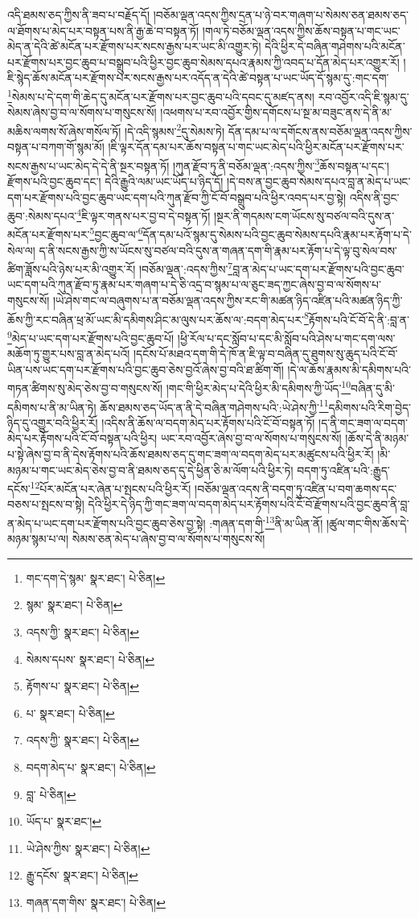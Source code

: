 འདི་ཐམས་ཅད་ཀྱིས་ནི་ཟབ་པ་བརྗོད་དོ། །བཅོམ་ལྡན་འདས་ཀྱིས་དྲན་པ་ཉེ་བར་གཞག་པ་སེམས་ཅན་ཐམས་ཅད་ལ་ཐོགས་པ་མེད་པར་བསྟན་པས་ནི་རྒྱ་ཆེ་བ་བསྟན་ཏོ། །གལ་ཏེ་བཅོམ་ལྡན་འདས་ཀྱིས་ཆོས་བསྟན་པ་གང་ཡང་མེད་ན་དེའི་ཚེ་མངོན་པར་རྫོགས་པར་སངས་རྒྱས་པར་ཡང་མི་འགྱུར་ཏེ། དེའི་ཕྱིར་དེ་བཞིན་གཤེགས་པའི་མངོན་པར་རྫོགས་པར་བྱང་ཆུབ་པ་བསྒྲུབ་པའི་ཕྱིར་བྱང་ཆུབ་སེམས་དཔའ་རྣམས་ཀྱི་འབད་པ་དོན་མེད་པར་འགྱུར་རོ། །ཇི་སྙེད་ཆོས་མངོན་པར་རྫོགས་པར་སངས་རྒྱས་པར་འདོད་ན་དེའི་ཚེ་བསྟན་པ་ཡང་ཡོད་དོ་སྙམ་དུ་:གང་དག་\footnote{གང་དག་དེ་སྙམ་  སྣར་ཐང་།  པེ་ཅིན། }སེམས་པ་དེ་དག་གི་ཆེད་དུ་མངོན་པར་རྫོགས་པར་བྱང་ཆུབ་པའི་དབང་དུ་མཛད་ནས། རབ་འབྱོར་འདི་ཇི་སྙམ་དུ་སེམས་ཞེས་བྱ་བ་ལ་སོགས་པ་གསུངས་སོ། །འཕགས་པ་རབ་འབྱོར་གྱིས་དགོངས་པ་སྔ་མ་བཟུང་ནས་དེ་ནི་མ་མཆིས་ལགས་སོ་ཞེས་གསོལ་ཏོ། །དེ་འདི་སྙམས་\footnote{སྙམ་  སྣར་ཐང་།  པེ་ཅིན། }དུ་སེམས་ཏེ། དོན་དམ་པ་ལ་དགོངས་ནས་བཅོམ་ལྡན་འདས་ཀྱིས་བསྟན་པ་བཀག་གོ་སྙམ་མོ། །ཇི་ལྟར་དོན་དམ་པར་ཆོས་བསྟན་པ་གང་ཡང་མེད་པའི་ཕྱིར་མངོན་པར་རྫོགས་པར་སངས་རྒྱས་པ་ཡང་མེད་དེ་དེ་ནི་སྔར་བསྟན་ཏོ། །ཀུན་རྫོབ་ཏུ་ནི་བཅོམ་ལྡན་:འདས་ཀྱིས་\footnote{འདས་ཀྱི་  སྣར་ཐང་།  པེ་ཅིན། }ཆོས་བསྟན་པ་དང་། རྫོགས་པའི་བྱང་ཆུབ་དང་། དེའི་རྒྱུའི་ལམ་ཡང་ཡོད་པ་ཉིད་དོ། །དེ་བས་ན་བྱང་ཆུབ་སེམས་དཔའ་བླ་ན་མེད་པ་ཡང་དག་པར་རྫོགས་པའི་བྱང་ཆུབ་ཡང་དག་པའི་ཀུན་རྫོབ་ཀྱི་ངོ་བོ་བསྒྲུབ་པའི་ཕྱིར་འབད་པར་བྱ་སྟེ། འདིས་ནི་བྱང་ཆུབ་:སེམས་དཔའ་\footnote{སེམས་དཔས་  སྣར་ཐང་།  པེ་ཅིན། }ཇི་ལྟར་གནས་པར་བྱ་བ་དེ་བསྟན་ཏོ། །སྔར་ནི་གདམས་ངག་ཡོངས་སུ་བཙལ་བའི་དུས་ན་མངོན་པར་རྫོགས་པར་\footnote{རྟོགས་པ་  སྣར་ཐང་།  པེ་ཅིན། }བྱང་ཆུབ་ལ་\footnote{པ་  སྣར་ཐང་།  པེ་ཅིན། }དོན་དམ་པའོ་སྙམ་དུ་སེམས་པའི་བྱང་ཆུབ་སེམས་དཔའི་རྣམ་པར་རྟོག་པ་དེ་སེལ་ལ། ད་ནི་སངས་རྒྱས་ཀྱི་ས་ཡོངས་སུ་བཙལ་བའི་དུས་ན་གཞན་དག་གི་རྣམ་པར་རྟོག་པ་དེ་ལྟ་བུ་སེལ་བས་ཚིག་ཟློས་པའི་ཉེས་པར་མི་འགྱུར་རོ། །བཅོམ་ལྡན་:འདས་ཀྱིས་\footnote{འདས་ཀྱི་  སྣར་ཐང་།  པེ་ཅིན། }བླ་ན་མེད་པ་ཡང་དག་པར་རྫོགས་པའི་བྱང་ཆུབ་ཡང་དག་པའི་ཀུན་རྫོབ་ཏུ་རྣམ་པར་གཞག་པ་དེ་ཅི་འདྲ་བ་སྙམ་པ་ལ་ཅུང་ཟད་ཀྱང་ཞེས་བྱ་བ་ལ་སོགས་པ་གསུངས་སོ། །ཡེ་ཤེས་གང་ལ་བཞུགས་པ་ན་བཅོམ་ལྡན་འདས་ཀྱིས་རང་གི་མཚན་ཉིད་འཛིན་པའི་མཚན་ཉིད་ཀྱི་ཆོས་ཀྱི་རང་བཞིན་ཕྲ་མོ་ཡང་མི་དམིགས་ཤིང་མ་ལུས་པར་ཆོས་ལ་:བདག་མེད་པར་\footnote{བདག་མེད་པ་  སྣར་ཐང་།  པེ་ཅིན། }རྟོགས་པའི་ངོ་བོ་དེ་ནི་:བླ་ན་\footnote{བླ་  པེ་ཅིན། }མེད་པ་ཡང་དག་པར་རྫོགས་པའི་བྱང་ཆུབ་པོ། །ཕྱི་རོལ་པ་དང་སློབ་པ་དང་མི་སློབ་པའི་ཤེས་པ་གང་དག་ལས་མཆོག་ཏུ་གྱུར་པས་བླ་ན་མེད་པའོ། །དངོས་པོ་མཐའ་དག་གི་དེ་ཁོ་ན་ཇི་ལྟ་བ་བཞིན་དུ་ཐུགས་སུ་ཆུད་པའི་ངོ་བོ་ཡིན་པས་ཡང་དག་པར་རྫོགས་པའི་བྱང་ཆུབ་ཅེས་བྱའོ་ཞེས་བྱ་བའི་ཐ་ཚིག་གོ། །དེ་ལ་ཆོས་རྣམས་མི་དམིགས་པའི་གཏན་ཚིགས་སུ་མེད་ཅེས་བྱ་བ་གསུངས་སོ། །གང་གི་ཕྱིར་མེད་པ་དེའི་ཕྱིར་མི་དམིགས་ཀྱི་ཡོད་\footnote{ཡོད་པ་  སྣར་ཐང་། }བཞིན་དུ་མི་དམིགས་པ་ནི་མ་ཡིན་ཏེ། ཆོས་ཐམས་ཅད་ཡོད་ན་ནི་དེ་བཞིན་གཤེགས་པའི་:ཡེ་ཤེས་ཀྱི་\footnote{ཡེ་ཤེས་ཀྱིས་  སྣར་ཐང་།  པེ་ཅིན། }དམིགས་པའི་རིག་བྱེད་ཉིད་དུ་འགྱུར་བའི་ཕྱིར་རོ། །འདིས་ནི་ཆོས་ལ་བདག་མེད་པར་རྟོགས་པའི་ངོ་བོ་བསྟན་ཏོ། །ད་ནི་གང་ཟག་ལ་བདག་མེད་པར་རྟོགས་པའི་ངོ་བོ་བསྟན་པའི་ཕྱིར། ཡང་རབ་འབྱོར་ཞེས་བྱ་བ་ལ་སོགས་པ་གསུངས་སོ། །ཆོས་དེ་ནི་མཉམ་པ་སྟེ་ཞེས་བྱ་བ་ནི་དེས་རྟོགས་པའི་ཆོས་ཐམས་ཅད་དུ་གང་ཟག་ལ་བདག་མེད་པར་མཚུངས་པའི་ཕྱིར་རོ། །མི་མཉམ་པ་གང་ཡང་མེད་ཅེས་བྱ་བ་ནི་ཐམས་ཅད་དུ་དེ་ཕྱིན་ཅི་མ་ལོག་པའི་ཕྱིར་ཏེ། བདག་ཏུ་འཛིན་པའི་:རྒྱུད་དངོས་\footnote{རྒྱུ་དངོས་  སྣར་ཐང་།  པེ་ཅིན། }པོར་མངོན་པར་ཞེན་པ་སྤངས་པའི་ཕྱིར་རོ། །བཅོམ་ལྡན་འདས་ནི་བདག་ཏུ་འཛིན་པ་བག་ཆགས་དང་བཅས་པ་སྤངས་བ་སྟེ། དེའི་ཕྱིར་དེ་ཉིད་ཀྱི་གང་ཟག་ལ་བདག་མེད་པར་རྟོགས་པའི་ངོ་བོ་རྫོགས་པའི་བྱང་ཆུབ་ནི་བླ་ན་མེད་པ་ཡང་དག་པར་རྫོགས་པའི་བྱང་ཆུབ་ཅེས་བྱ་སྟེ། :གཞན་དག་གི་\footnote{གཞན་དག་གིས་  སྣར་ཐང་།  པེ་ཅིན། }ནི་མ་ཡིན་ནོ། །ཚུལ་གང་གིས་ཆོས་དེ་མཉམ་སྙམ་པ་ལ། སེམས་ཅན་མེད་པ་ཞེས་བྱ་བ་ལ་སོགས་པ་གསུངས་སོ། 